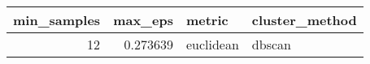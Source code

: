 \begin{tabular}{rrll}
\toprule
min_samples & max_eps & metric & cluster_method \\
\midrule
12 & 0.273639 & euclidean & dbscan \\
\bottomrule
\end{tabular}
